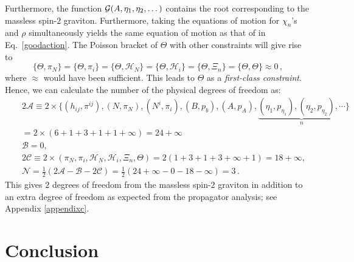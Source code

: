 \documentclass[a4paper,12pt]{article}
\newcommand{\+}{^{\dagger}}
\newcommand{\2}{\frac{1}{2}}
\newcommand{\3}{\frac{1}{3}}
\newcommand{\4}{\frac{1}{4}}
\newcommand{\6}{\frac{1}{6}}
\newcommand{\8}{\frac{1}{8}}
\begin{document}
Furthermore, the function ${\cal G}(A,\eta_{1},\eta_{2},\dots)$ contains the root corresponding to the massless spin-$2$ graviton. Furthermore, taking the equations of motion for $\chi_{n}$'s and $\rho$ simultaneously yields the same equation of motion as that of in Eq.~\eqref{goodaction}. The
Poisson bracket of $\Theta$ with other constraints will give rise to
\begin{equation}
\{\Theta,\pi_N\}=\{\Theta,\pi_i\}=\{\Theta,\mathcal{H}_{N}\}=\{\Theta,\mathcal{H}_{i}\}=\{\Theta,\Xi
_{n}\}=\{\Theta,\Theta\}\approx0\,,
\end{equation}
where $\approx$ would have been sufficient. This leads to $\Theta$ as a {\it first-class constraint}. Hence, we can calculate the number of the physical degrees of freedom  as: 
\begin{eqnarray}
&&2\mathcal{A}\equiv2\times\bigg\{(h_{ij}, \pi^{ij}),(N,\pi_N),(N^i,
\pi_i),(B,p_b),(A,p_A),\underbrace{(\eta_1,p_{\eta_1}),(\eta_2,p_{\eta_2}),\cdots}_{n}\bigg\}
\nonumber\\&&=2\times(6+1+3+1+1+\infty)=24+\infty\nonumber\\
&&\mathcal{B}=0,\nonumber\\
&&2\mathcal{C}\equiv2\times(\pi_N,\pi_i,\mathcal{H}_N,\mathcal{H}_{i},\Xi
_{n},\Theta)=2(1+3+1+3+\infty+1)=18+\infty,\nonumber\\
&&\mathcal{N}=\frac{1}{2}(2\mathcal{A}-\mathcal{B}-2\mathcal{C})=\frac{1}{2}(24+\infty-0-18-\infty)=3\,.
\end{eqnarray}
This gives $2$ degrees of freedom from the massless spin-$2$ graviton in addition to an extra degree of freedom as expected from the propagator analysis; see Appendix \ref{appendixc}. 




\section{Conclusion}
\label{sec:conc}
\end{document}
